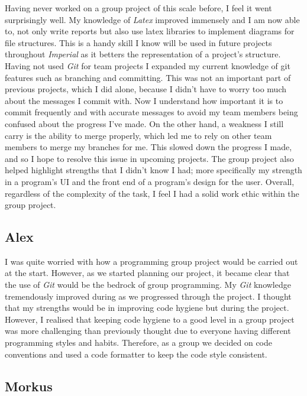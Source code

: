 \documentclass[10pt]{article}
\begin{document}
Having never worked on a group project of this scale before, I feel it went surprisingly well. My knowledge of {\sl Latex} improved immensely and I am now able to, not only write reports but also use latex libraries to implement diagrams for file structures. This is a handy skill I know will be used in future projects throughout {\sl Imperial} as it betters the representation of a project’s structure. Having not used {\sl Git} for team projects I expanded my current knowledge of git features such as branching and committing. This was not an important part of previous projects, which I did alone, because I didn’t have to worry too much about the messages I commit with. Now I understand how important it is to commit frequently and with accurate messages to avoid my team members being confused about the progress I’ve made. On the other hand, a weakness I still carry is the ability to merge properly, which led me to rely on other team members to merge my branches for me. This slowed down the progress I made, and so I hope to resolve this issue in upcoming projects. The group project also helped highlight strengths that I didn’t know I had; more specifically my strength in a program’s UI and the front end of a program’s design for the user. Overall, regardless of the complexity of the task, I feel I had a solid work ethic within the group project.

\subsection*{Alex}

I was quite worried with how a programming group project would be carried out at the start. However, as we started planning our project, it became clear that the use of {\sl Git} would be the bedrock of group programming. My {\sl Git} knowledge tremendously improved during as we progressed through the project. I thought that my strengths would be in improving code hygiene but during the project. However, I realised that keeping code hygiene to a good level in a group project was more challenging than previously thought due to everyone having different programming styles and habits. Therefore, as a group we decided on code conventions and used a code formatter to keep the code style consistent.


\subsection*{Morkus}
\end{document}
